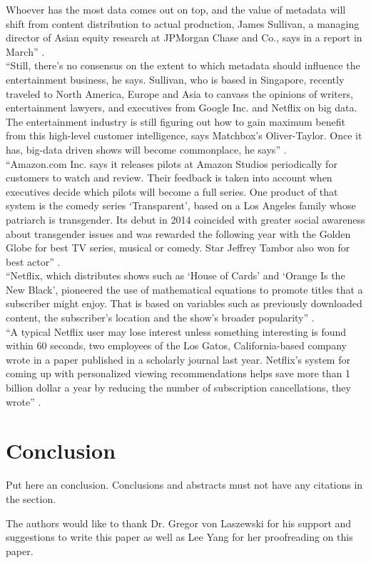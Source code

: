 \documentclass[sigconf]{acmart}
\begin{document}
Whoever has the most data comes out on top, and the value of metadata will shift from content distribution to actual production, James Sullivan, a managing director of Asian equity research at JPMorgan Chase and Co., says in a report in March'' \cite{Whitley2016data}. \\
``Still, there’s no consensus on the extent to which metadata should influence the entertainment business, he says. Sullivan, who is based in Singapore, recently traveled to North America, Europe and Asia to canvass the opinions of writers, entertainment lawyers, and executives from Google Inc. and Netflix on big data.
The entertainment industry is still figuring out how to gain maximum benefit from this high-level customer intelligence, says Matchbox’s Oliver-Taylor. Once it has, big-data driven shows will become commonplace, he says'' \cite{Whitley2016data}. \\
``Amazon.com Inc. says it releases pilots at Amazon Studios periodically for customers to watch and review. Their feedback is taken into account when executives decide which pilots will become a full series.
One product of that system is the comedy series `Transparent', based on a Los Angeles family whose patriarch is transgender. Its debut in 2014 coincided with greater social awareness about transgender issues and was rewarded the following year with the Golden Globe for best TV series, musical or comedy. Star Jeffrey Tambor also won for best actor'' \cite{Whitley2016data}. \\
``Netflix, which distributes shows such as `House of Cards' and `Orange Is the New Black', pioneered the use of mathematical equations to promote titles that a subscriber might enjoy. That is based on variables such as previously downloaded content, the subscriber's location and the show’s broader popularity'' \cite{Whitley2016data}. \\
``A typical Netflix user may lose interest unless something interesting is found within 60 seconds, two employees of the Los Gatos, California-based company wrote in a paper published in a scholarly journal last year. Netflix's system for coming up with personalized viewing recommendations helps save more than 1 billion dollar a year by reducing the number of subscription cancellations, they wrote'' \cite{Whitley2016data}. \\



\section{Conclusion}

Put here an conclusion. Conclusions and abstracts must not have any
citations in the section. 

\begin{acks}

  The authors would like to thank Dr. Gregor von Laszewski for his
  support and suggestions to write this paper as well as Lee Yang for her proofreading on this paper. 

\end{acks}


 
\end{document}
